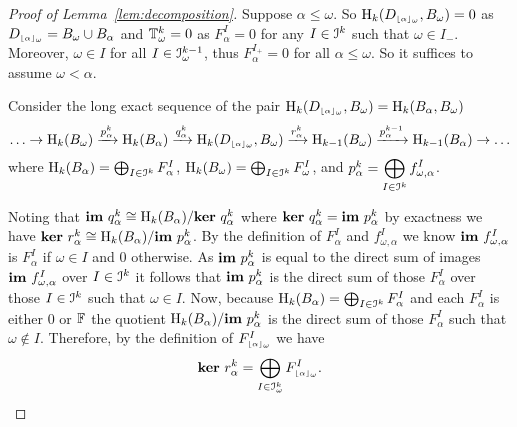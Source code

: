 \begin{proof}[Proof of Lemma~\ref{lem:decomposition}]
  Suppose $\alpha\leq\omega$.
  So $\mathrm{H}_k(D_{\scriptscriptstyle \lfloor\alpha\rfloor_{\omega}}, B_\omega) = 0$ as $D_{\scriptscriptstyle \lfloor\alpha\rfloor_{\omega}} = B_\omega\cup B_\alpha$ and $\mathbb{T}^k_\omega = 0$ as $F_\alpha^I = 0$ for any $I\in \mathcal{I}^k$ such that $\omega\in I_-$.
  Moreover, $\omega\in I$ for all $I\in \mathcal{I}_\omega^{k-1}$, thus $F_\alpha^{I_+} = 0$ for all $\alpha\leq\omega$.
  So it suffices to assume $\omega < \alpha$.

  Consider the long exact sequence of the pair $\mathrm{H}_k(D_{\scriptscriptstyle \lfloor\alpha\rfloor_{\omega}}, B_\omega) = \mathrm{H}_k(B_\alpha, B_\omega)$
  \[ \ldots\to \mathrm{H}_k(B_\omega)\xrightarrow{p_\alpha^k} \mathrm{H}_k(B_\alpha)\xrightarrow{q_\alpha^k}\mathrm{H}_k(D_{\scriptscriptstyle \lfloor\alpha\rfloor_{\omega}}, B_\omega)\xrightarrow{r_\alpha^k} \mathrm{H}_{k-1}(B_\omega)\xrightarrow{p_\alpha^{k-1}}\mathrm{H}_{k-1}(B_\alpha)\to\ldots\]
  where $\mathrm{H}_k(B_\alpha) = \bigoplus_{I\in \mathcal{I}^k}F_\alpha^I$, $\mathrm{H}_k(B_\omega) = \bigoplus_{I\in \mathcal{I}^k}F_\omega^I$, and $p_\alpha^k = \displaystyle\bigoplus_{I\in\mathcal{I}^k} f_{\omega,\alpha}^I$.

  Noting that $\mathbf{im}~q_\alpha^k \cong \mathrm{H}_k(B_\alpha) / \mathbf{ker}~q_\alpha^k$ where $\mathbf{ker}~q_\alpha^k = \mathbf{im}~p_\alpha^k$ by exactness we have $\mathbf{ker}~r_\alpha^k \cong \mathrm{H}_k(B_\alpha) / \mathbf{im}~p_\alpha^k$.
  By the definition of $F_\alpha^I$ and $f_{\omega,\alpha}^I$ we know $\mathbf{im}~f_{\omega,\alpha}^I$ is $F_\alpha^I$ if $\omega\in I$ and 0 otherwise.
  As $\mathbf{im}~p_\alpha^k$ is equal to the direct sum of images $\mathbf{im}~f_{\omega,\alpha}^I$ over $I\in\mathcal{I}^k$ it follows that $\mathbf{im}~p_\alpha^k$ is the direct sum of those $F_\alpha^I$ over those $I\in\mathcal{I}^k$ such that $\omega\in I$.
  Now, because $\mathrm{H}_k(B_\alpha) = \bigoplus_{I\in \mathcal{I}^k}F_\alpha^I$ and each $F_\alpha^I$ is either 0 or $\mathbb{F}$ the quotient $\mathrm{H}_k(B_\alpha) / \mathbf{im}~p_\alpha^k$ is the direct sum of those $F_\alpha^I$ such that $\omega\notin I$.
  Therefore, by the definition of $F_{\scriptscriptstyle \lfloor\alpha\rfloor_{\omega}}^I$ we have
  \[ \mathbf{ker}~r_\alpha^k = \bigoplus_{I\in\mathcal{I}_\omega^k} F_{\scriptscriptstyle \lfloor\alpha\rfloor_{\omega}}^I.\]


\end{proof}
